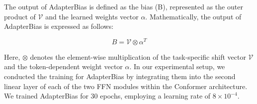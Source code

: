 The output of AdapterBias is defined as the bias (B), represented as the outer product of $\mathcal{V}$ and the learned weights vector $\alpha$. Mathematically, the output of AdapterBias is expressed as follows:

\begin{equation}
    B = \mathcal{V} \otimes \alpha^T    
\end{equation}

Here, \(\otimes\) denotes the element-wise multiplication of the task-specific shift vector \(\mathcal{V}\) and the token-dependent weight vector \(\alpha\).
In our experimental setup, we conducted the training for AdapterBias by integrating them into the second linear layer of each of the two FFN modules within the Conformer architecture. We trained AdapterBias for 30 epochs, employing a learning rate of $8 \times 10^{-4}$.
